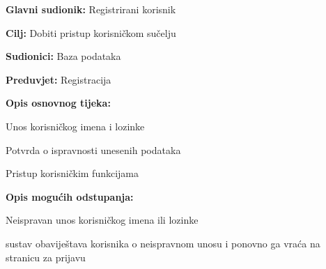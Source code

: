 \noindent {}
\begin{packed_item}
	\item \textbf{Glavni sudionik: }Registrirani korisnik
	\item  \textbf{Cilj:} Dobiti pristup korisničkom sučelju
	\item  \textbf{Sudionici:} Baza podataka
	\item  \textbf{Preduvjet:} Registracija
	\item  \textbf{Opis osnovnog tijeka:}
	
	\item[] \begin{packed_enum}
		
		\item Unos korisničkog imena i lozinke
		\item Potvrda o ispravnosti unesenih podataka
		\item Pristup korisničkim funkcijama
	\end{packed_enum}
	
	\item  \textbf{Opis mogućih odstupanja:}
	
	\item[] \begin{packed_item}
		
		\item[1.a] Neispravan unos korisničkog imena ili lozinke
		\item[] \begin{packed_enum}
			
			\item sustav obaviještava korisnika o neispravnom unosu i ponovno ga vraća na stranicu za prijavu
			
		\end{packed_enum}
	\end{packed_item}
\end{packed_item}

